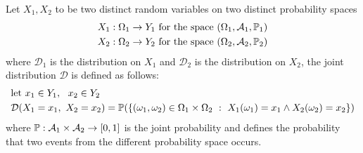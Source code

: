 \documentclass[10pt, letterpaper]{report}
\begin{document}
Let $X_1,X_2$ to be two distinct random variables on two distinct probability spaces\begin{align}
    &X_1:\Omega_1\rightarrow Y_1 \text{ for the space }(\Omega_1,\mathcal A_1,{\mathbb P}_1)\\
    &X_2:\Omega_2\rightarrow Y_2 \text{ for the space }(\Omega_2,\mathcal A_2,{\mathbb P}_2)
\end{align}
where $\mathcal D_1$ is the distribution on $X_1$ and $\mathcal D_2$ is the distribution on $X_2$, the joint distribution $\mathcal D$ is defined as follows:\begin{align}
    &\text{let }x_1\in Y_1, \ \ x_2\in Y_2\\
    &\mathcal D(X_1=x_1, \ X_2=x_2)=\Prob(\{(\omega_1,\omega_2)\in\Omega_1\times\Omega_2 \ : \ X_1(\omega_1)=x_1\land X_2(\omega_2)=x_2\})
\end{align}
where ${\mathbb P}:\mathcal A_1\times\mathcal A_2\rightarrow[0,1]$ is the joint probability and defines the probability that two events from the different probability space occurs.\bigskip
\end{document}
